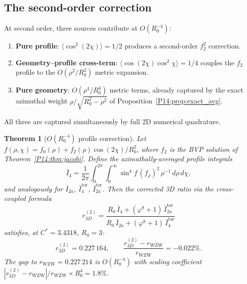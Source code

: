 \documentclass[11pt,a4paper]{article}
\newtheorem{theorem}{Theorem}[section]
\theoremstyle{definition}
\theoremstyle{remark}
\newcommand{\vp}{\varphi}
\newcommand{\Cstar}{C^*}
\newcommand{\fzero}{f_0}
\newcommand{\ftwo}{f_2}
\newcommand{\Rzero}{R_0}
\begin{document}
\subsection{The second-order correction}

At second order, three sources contribute at $O(\Rzero^{-4})$:
\begin{enumerate}[noitemsep,label=(\alph*)]
\item \textbf{Pure profile}: $\langle\cos^2(2\chi)\rangle = 1/2$
  produces a second-order $\ftwo^2$ correction.
\item \textbf{Geometry--profile cross-term}:
  $\langle\cos(2\chi)\cos^2\chi\rangle = 1/4$ couples the $\ftwo$
  profile to the $O(\rho^2/\Rzero^2)$ metric expansion.
\item \textbf{Pure geometry}: $O(\rho^4/\Rzero^4)$ metric terms,
  already captured by the exact azimuthal weight
  $\rho/\sqrt{\Rzero^2-\rho^2}$ of Proposition~\ref{P14:prop:exact_avg}.
\end{enumerate}
All three are captured simultaneously by full 2D numerical quadrature.

\begin{theorem}[$O(\Rzero^{-4})$ profile correction]
\label{P14:thm:second_order}
Let $f(\rho,\chi) = \fzero(\rho) + \ftwo(\rho)\cos(2\chi)/\Rzero^2$,
where $\ftwo$ is the BVP solution of Theorem~\ref{P14:thm:jacobi}.
Define the azimuthally-averaged profile integrals
\begin{equation}
  \bar{I}_4 = \frac{1}{2\pi}\int_0^{2\pi}\!\!\int_0^\infty
  \sin^4\!f\,(f_\rho)^2\,\rho^{-1}\,d\rho\,d\chi,
  \label{P14:eq:I4_avg}
\end{equation}
and analogously for $\bar{I}_{2a}$, $\bar{I}_4^{\mathrm{tor}}$,
$\bar{I}_{2a}^{\mathrm{tor}}$.
Then the corrected 3D ratio via the cross-coupled formula
\begin{equation}
  r_{3D}^{(2)}
  = \frac{\Rzero\,\bar{I}_4 + (\vp^8+1)\,\bar{I}_{2a}^{\mathrm{tor}}}
         {\Rzero\,\bar{I}_{2a} + (\vp^8+1)\,\bar{I}_4^{\mathrm{tor}}}
  \label{P14:eq:r3D_second}
\end{equation}
satisfies, at $\Cstar = 3.4318$, $\Rzero = 3$:
\begin{equation}
  \boxed{r_{3D}^{(2)} = 0.227\,164,\qquad
  \frac{r_{3D}^{(2)} - r_{\mathrm{WZW}}}{r_{\mathrm{WZW}}} = -0.022\%.}
  \label{P14:eq:r3D_second_val}
\end{equation}
The gap to $r_{\mathrm{WZW}} = 0.227\,214$ is $O(\Rzero^{-4})$
with scaling coefficient
$|r_{3D}^{(2)}-r_{\mathrm{WZW}}|/r_{\mathrm{WZW}} \times \Rzero^4
= 1.8\%$.
\end{theorem}
\end{document}
